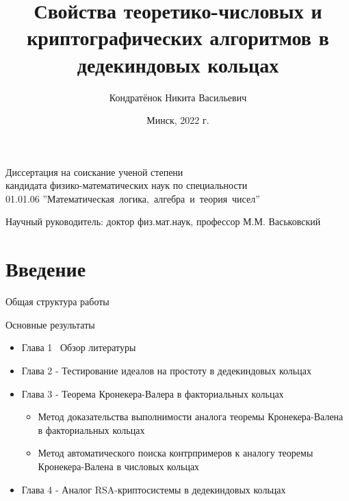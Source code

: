 \documentclass[8pt, xcolor=x11names]{beamer}
\author[Кондратёнок Н.В.]{Кондратёнок Никита Васильевич}
\title[]{Свойства теоретико-числовых и криптографических алгоритмов в дедекиндовых кольцах}
\date{Минск, 2022 г.}
\begin{document}
\begin{frame}
    \titlepage

    \begin{center}
        Диссертация на соискание ученой степени\\
        кандидата физико-математических наук по специальности\\
        01.01.06 ''Математическая~логика,~алгебра~и~теория~чисел''
    \end{center}

    \begin{center}
        Научный руководитель: доктор физ.мат.наук, профессор М.М. Васьковский
    \end{center}    
\end{frame}

\section{Введение}

\begin{frame}{Общая структура работы}
    \begin{block}{Основные результаты}
        \begin{itemize}
            \item Глава 1 \textendash\ Обзор литературы
            
            \item Глава 2 - Тестирование идеалов на простоту в дедекиндовых кольцах

            \item Глава 3 - Теорема Кронекера-Валера в факториальных кольцах
            \begin{itemize}
                \item Метод доказательства выполнимости аналога теоремы Кронекера-Валена в факториальных кольцах

                \item Метод автоматического поиска контрпримеров к аналогу теоремы Кронекера-Валена в числовых кольцах
            \end{itemize}
            
            \item Глава 4 - Аналог RSA-криптосистемы в дедекиндовых кольцах
        \end{itemize}
    \end{block}
\end{frame}
\end{document}

